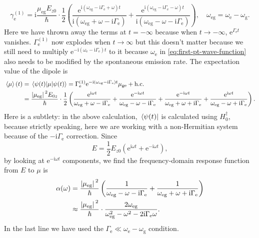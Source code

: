 \documentclass[hyperref, a4paper]{article}
\newcommand*{\ii}{\mathrm{i}}
\newcommand*{\ee}{\mathrm{e}}
\newcommand*{\Gammae}{\Gamma_{\text{e}}}
\newcommand*{\omegae}{\omega_{\text{e}}}
\newcommand*{\omegag}{\omega_{\text{g}}}
\newcommand*{\omegaeg}{\omega_{\text{eg}}}
\begin{document}
\begin{equation}
    \gamma^{(1)}_{\text{e}} = \ii \frac{\mu_{\text{eg}} E_{z0}}{\hbar} 
    \cdot \frac{1}{2} \left(
        \frac{\ee^{\ii (\omegaeg - \ii \Gammae + \omega) t}}{
            \ii (\omegaeg + \omega - \ii \Gammae)
        } + 
        \frac{\ee^{\ii (\omegaeg - \ii \Gammae - \omega) t}}{
            \ii (\omegaeg - \omega - \ii \Gammae)
        }
    \right), \quad 
    \omegaeg = \omegae - \omegag.
\end{equation}
Here we have thrown away the terms at $t = - \infty$ 
because when $t \to -\infty$, $\ee^{\Gammae t}$ vanishes.
$\Gammae^{(1)}$ now explodes when $t \to \infty$
but this doesn't matter because we still need to multiply 
$\ee^{- \ii (\omegae - \ii \Gammae) t}$ to it
because $\omegae$ in \eqref{eq:first-pt-wave-function}
also needs to be modified by the spontaneous emission rate.
The expectation value of the dipole is 
\begin{equation}
    \begin{aligned}
        \expval*{\mu}(t) &= \expval*{\mu}{\psi(t)}
        = \Gammae^{(1)}
        \ee^{- \ii (\omegaeg - \ii \Gammae) t} \mu_{\text{ge}} + \text{h.c.} \\ 
        &= \frac{\abs*{\mu_{\text{eg}}}^2 E_{0z}}{\hbar} \cdot \frac{1}{2} \left(
            \frac{\ee^{\ii \omega t}}{\omegaeg + \omega - \ii \Gammae}
            + \frac{\ee^{- \ii \omega t}}{\omegaeg - \omega - \ii \Gammae}
            + \frac{\ee^{- \ii \omega t}}{\omegaeg + \omega + \ii \Gammae}
            + \frac{\ee^{\ii \omega t}}{\omegaeg - \omega + \ii \Gammae}
        \right).
    \end{aligned}
\end{equation}
Here is a subtlety: in the above calculation, $\bra*{\psi(t)}$ is calculated using $H_0^\dagger$,
because strictly speaking, here we are working with a non-Hermitian system 
because of the $- \ii \Gammae$ correction.
Since 
\begin{equation}
    E = \frac{1}{2} E_{z0} (\ee^{\ii \omega t} + \ee^{- \ii \omega t}),
\end{equation}
by looking at $\ee^{- \ii \omega t}$ components,
we find the frequency-domain response function from $E$ to $\mu$ is 
\begin{equation}
    \begin{aligned}
        \alpha(\omega) &= \frac{\abs*{\mu_{\text{eg}}}^2}{\hbar} \left(
            \frac{1}{\omegaeg - \omega - \ii \Gammae}
            + \frac{1}{\omegaeg + \omega + \ii \Gammae}
        \right) \\
        &\approx \frac{\abs*{\mu_{\text{eg}}}^2}{\hbar} \cdot 
        \frac{2\omegaeg}{
            \omegaeg^2 - \omega^2 - 2 \ii \Gammae \omega
        }.
    \end{aligned} 
    \label{eq:alpha-two-level}
\end{equation}
In the last line we have used the $\Gammae \ll \omegae - \omegag$ condition.
\end{document}
